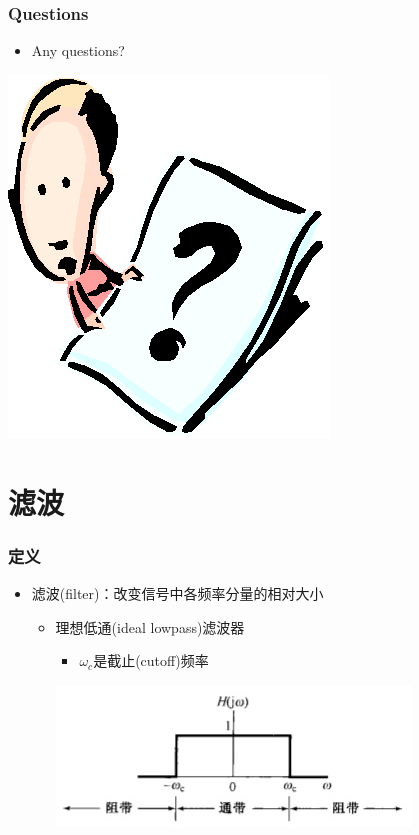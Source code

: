 \documentclass[CJKutf8,xcolor=pdftex,dvipsnames,table]{beamer}
\begin{document}
\begin{CJK*}{UTF8}{song}
  \begin{frame}
    \frametitle{Questions}
    \begin{itemize}
    \item Any questions?
    \end{itemize}
    \begin{center}
      \includegraphics[scale=.5]{question}
    \end{center}
  \end{frame} 


  \section{滤波}
  
  \begin{frame}
    \frametitle{定义}
    \begin{itemize}
    \item 滤波(filter)：改变信号中各频率分量的相对大小
    	\begin{itemize}
    	\item 理想低通(ideal lowpass)滤波器
			\begin{itemize}
			\item $\omega_c$是截止(cutoff)频率
			\end{itemize} 
    
    		\begin{center}
      		\includegraphics[scale=.4]{ss-c-f3-26}
    		\end{center}
    

\end{itemize}
\end{itemize}
\end{frame}
\end{CJK*}
\end{document}
